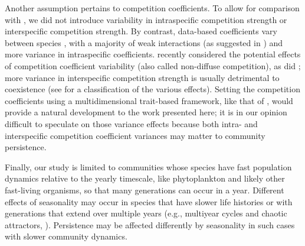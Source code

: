 \documentclass[smallcondensed,referee]{svjour3}       %
\begin{document}
Another assumption pertains to competition coefficients. To allow
for comparison with \citet{scranton_coexistence_2016}, we did not
introduce variability in intraspecific competition strength or interspecific
competition strength. By contrast, data-based coefficients vary between
species \citep{barraquand2018coastal}, with a majority of weak interactions
(as suggested in \citealp{wootton_measurement_2005}) and more variance
in intraspecific coefficients. \citet{stump_multispecies_2017} recently
considered the potential effects of competition coefficient variability
(also called non-diffuse competition), as did \citet{kokkoris_variability_2002};
more variance in interspecific competition strength is usually detrimental
to coexistence (see \citet{stump_multispecies_2017} for a classification
of the various effects). Setting the competition coefficients using
a multidimensional trait-based framework, like that of \citet{ashby_competing_2017},
would provide a natural development to the work presented here; it
is in our opinion difficult to speculate on those variance effects
because both intra- and interspecific competition coefficient variances
may matter to community persistence. 

Finally, our study is limited to communities whose species have fast
population dynamics relative to the yearly timescale, like phytoplankton
and likely other fast-living organisms, so that many generations can
occur in a year. Different effects of seasonality may occur in species
that have slower life histories or with generations that extend over
multiple years (e.g., multiyear cycles and chaotic attractors, \citealt{rinaldi_multiple_1993,taylor_how_2013,tyson_seasonally_2016}).
Persistence may be affected differently by seasonality in such cases
with slower community dynamics. 
\end{document}
